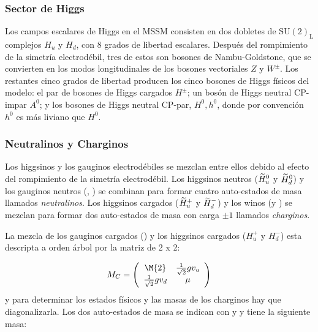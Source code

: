 



\subsubsection{Sector de Higgs}

Los campos escalares de Higgs en el MSSM consisten en dos dobletes de
$\text{SU}(2)_\text{L}$ complejos $H_u$ y $H_d$, con 8 grados de libertad
escalares. Después del rompimiento de la simetría electrodébil, tres de estos
son bosones de Nambu-Goldstone, que se convierten en los modos longitudinales de
los bosones vectoriales $Z$ y $W^\pm$. Los restantes cinco grados de libertad
producen los cinco bosones de Higgs físicos del modelo: el par de bosones de
Higgs cargados $H^\pm$; un bosón de Higgs neutral CP-impar $A^0$; y los bosones
de Higgs neutral CP-par, $H^0,h^0$, donde por convención $h^0$ es más liviano
que $H^0$.


\subsubsection{Neutralinos y Charginos}\label{sec:mass_NC}

Los higgsinos y los gauginos electrodébiles se mezclan entre ellos debido al
efecto del rompimiento de la simetría electrodébil. Los higgsinos neutros
($\widetilde{H}_u^0$ y $\widetilde{H}_d^0$) y los gauginos neutros (\bino, \winozero) se
combinan para formar cuatro auto-estados de masa llamados \emph{neutralinos}.
Los higgsinos cargados ($\widetilde{H}_u^+$ y $\widetilde{H}_d^-$) y los winos (\winop y
\winom) se mezclan para formar dos auto-estados de masa con carga $\pm 1$
llamados \emph{charginos}.

La mezcla de los gauginos cargados (\winopm) y los higgsinos cargados ($H_u^+$ y
$H_d^-$) esta descripta a orden árbol por la matriz de 2 x 2:

\begin{equation}
  M_{C} = \left(
  \begin{array}{cc}
    \M{2} & \frac{1}{\sqrt{2}} g v_u \\ \frac{1}{\sqrt{2}} g v_d & \mu \\
  \end{array}
  \right)
\end{equation}
%
y para determinar los estados físicos y las masas de los charginos hay que
diagonalizarla. Los dos auto-estados de masa se indican con {\chinoonepm} y
{\chinotwopm} y tiene la siguiente masa:

